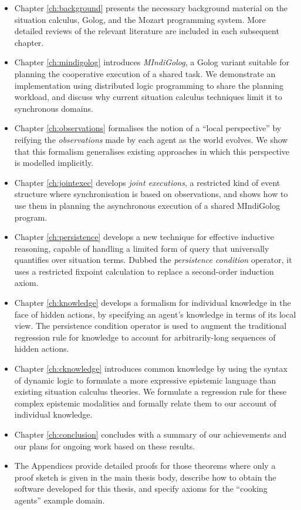 \begin{itemize}
\item Chapter \ref{ch:background} presents the necessary background material
on the situation calculus, Golog, and the Mozart programming system.
More detailed reviews of the relevant literature are included in each
subsequent chapter. 
\item Chapter \ref{ch:mindigolog} introduces \emph{MIndiGolog}, a Golog
variant suitable for planning the cooperative execution of a shared
task\emph{.} We demonstrate an implementation using distributed logic
programming to share the planning workload, and discuss why current
situation calculus techniques limit it to synchronous domains. 
\item Chapter \ref{ch:observations} formalises the notion of a {}``local
perspective'' by reifying the \emph{observations} made by each agent
as the world evolves. We show that this formalism generalises existing
approaches in which this perspective is modelled implicitly. 
\item Chapter \ref{ch:jointexec} develops \emph{joint executions}, a restricted
kind of event structure where synchronisation is based on observations,
and shows how to use them in planning the asynchronous execution of
a shared MIndiGolog program. 
\item Chapter \ref{ch:persistence} develops a new technique for effective
inductive reasoning, capable of handling a limited form of query that
universally quantifies over situation terms. Dubbed the \emph{persistence
condition} operator, it uses a restricted fixpoint calculation to
replace a second-order induction axiom. 
\item Chapter \ref{ch:knowledge} develops a formalism for individual knowledge
in the face of hidden actions, by specifying an agent's knowledge
in terms of its local view. The persistence condition operator is
used to augment the traditional regression rule for knowledge to account
for arbitrarily-long sequences of hidden actions. 
\item Chapter \ref{ch:cknowledge} introduces common knowledge by using
the syntax of dynamic logic to formulate a more expressive epistemic
language than existing situation calculus theories. We formulate a
regression rule for these complex epistemic modalities and formally
relate them to our account of individual knowledge. 
\item Chapter \ref{ch:conclusion} concludes with a summary of our achievements
and our plans for ongoing work based on these results. 
\item The Appendices provide detailed proofs for those theorems where only
a proof sketch is given in the main thesis body, describe how to obtain
the software developed for this thesis, and specify axioms for the
{}``cooking agents'' example domain. 
\end{itemize}
